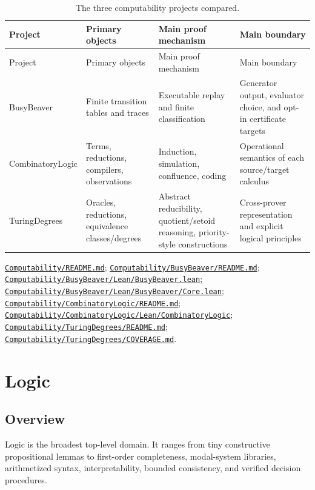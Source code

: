 \documentclass[
  10pt,
  a4paper,
  twoside,
  open=any,
  parskip=half,
  headings=big
]{scrreprt}
\newcommand{\CommitFull}{675d0a2ff0fc624fba199e006049016ba806f40a}
\newcommand{\RepoBlobBase}{https://github.com/VladimirReshetnikov/ProveIt/blob/\CommitFull/}
\newcommand{\RepoTreeBase}{https://github.com/VladimirReshetnikov/ProveIt/tree/\CommitFull/}
\newcommand{\RepoFile}[1]{%
  \href{\RepoBlobBase\detokenize{#1}}{\nolinkurl{#1}}}
\newcommand{\RepoDir}[1]{%
  \href{\RepoTreeBase\detokenize{#1}}{\nolinkurl{#1}}}
\begin{document}
\begin{longtable}{@{}L{.20\textwidth}L{.20\textwidth}L{.20\textwidth}L{.24\textwidth}@{}}
\caption{The three computability projects compared.}
\label{tab:computability-compare}\\
\toprule
Project & Primary objects & Main proof mechanism & Main boundary \\
\midrule
\endfirsthead
\toprule
Project & Primary objects & Main proof mechanism & Main boundary \\
\midrule
\endhead
BusyBeaver &
Finite transition tables and traces &
Executable replay and finite classification &
Generator output, evaluator choice, and opt-in certificate targets\\
CombinatoryLogic &
Terms, reductions, compilers, observations &
Induction, simulation, confluence, coding &
Operational semantics of each source/target calculus\\
TuringDegrees &
Oracles, reductions, equivalence classes/degrees &
Abstract reducibility, quotient/setoid reasoning, priority-style constructions &
Cross-prover representation and explicit logical principles\\
\bottomrule
\end{longtable}

\begin{sourcebox}
\RepoFile{Computability/README.md};
\RepoFile{Computability/BusyBeaver/README.md};
\RepoFile{Computability/BusyBeaver/Lean/BusyBeaver.lean};
\RepoFile{Computability/BusyBeaver/Lean/BusyBeaver/Core.lean};
\RepoFile{Computability/CombinatoryLogic/README.md};
\RepoDir{Computability/CombinatoryLogic/Lean/CombinatoryLogic};
\RepoFile{Computability/TuringDegrees/README.md};
\RepoFile{Computability/TuringDegrees/COVERAGE.md}.
\end{sourcebox}

\chapter{Logic}
\label{chap:logic}

\section{Overview}

Logic is the broadest top-level domain.  It ranges from tiny constructive
propositional lemmas to first-order completeness, modal-system libraries,
arithmetized syntax, interpretability, bounded consistency, and verified
decision procedures.
\end{document}

